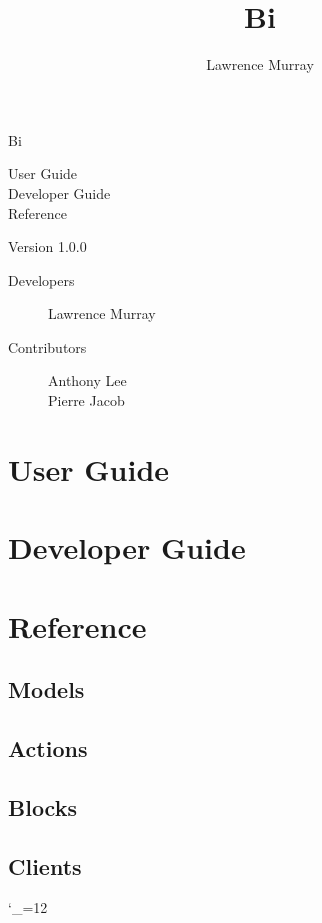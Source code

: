 \documentclass[a4paper,notitlepage]{refrep}
\title{Bi}
\author{Lawrence Murray}
\date{}
\makeatletter
\newcommand*{\toccontents}{\@starttoc{toc}}
\makeatother
\begin{document}
\pagestyle{empty}

\begin{leftbar}

\vspace{3cm}

\fontsize{72pt}{92pt}\selectfont
Bi

\vspace{6cm}

\fontsize{24pt}{30pt}\selectfont
User Guide \\
Developer Guide \\
Reference

\vspace{6cm}

\fontsize{16pt}{24pt}\selectfont
Version 1.0.0

\vspace{1cm}

\end{leftbar}

\newpage
\setcounter{page}{1}
\pagestyle{plain}

\begin{description}
\item[Developers]
Lawrence Murray
\item[Contributors]
Anthony Lee \\
Pierre Jacob
\end{description}

\newpage
\toccontents

\newpage
\setcounter{page}{1}

\chapter{User Guide\label{User_Guide}}



\chapter{Developer Guide\label{Developer_Guide}}



\chapter{Reference\label{Reference}}

\section{Models}


\section{Actions}


\section{Blocks}


\section{Clients}



\begingroup \catcode`_=12 %
\printindex
\endgroup
\end{document}
